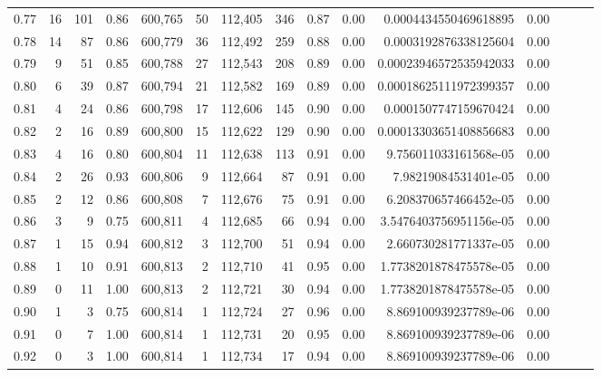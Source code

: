 \begin{tabular}{rrrrrrrrrrrrrrr}
0.77 &      16 &    101 &  0.86 &  600,765 &       50 &  112,405 &      346 &  0.87 &  0.00 &   0.0004434550469618895 &      0.00 \\
0.78 &      14 &     87 &  0.86 &  600,779 &       36 &  112,492 &      259 &  0.88 &  0.00 &   0.0003192876338125604 &      0.00 \\
0.79 &       9 &     51 &  0.85 &  600,788 &       27 &  112,543 &      208 &  0.89 &  0.00 &  0.00023946572535942033 &      0.00 \\
0.80 &       6 &     39 &  0.87 &  600,794 &       21 &  112,582 &      169 &  0.89 &  0.00 &  0.00018625111972399357 &      0.00 \\
0.81 &       4 &     24 &  0.86 &  600,798 &       17 &  112,606 &      145 &  0.90 &  0.00 &   0.0001507747159670424 &      0.00 \\
0.82 &       2 &     16 &  0.89 &  600,800 &       15 &  112,622 &      129 &  0.90 &  0.00 &  0.00013303651408856683 &      0.00 \\
0.83 &       4 &     16 &  0.80 &  600,804 &       11 &  112,638 &      113 &  0.91 &  0.00 &   9.756011033161568e-05 &      0.00 \\
0.84 &       2 &     26 &  0.93 &  600,806 &        9 &  112,664 &       87 &  0.91 &  0.00 &    7.98219084531401e-05 &      0.00 \\
0.85 &       2 &     12 &  0.86 &  600,808 &        7 &  112,676 &       75 &  0.91 &  0.00 &   6.208370657466452e-05 &      0.00 \\
0.86 &       3 &      9 &  0.75 &  600,811 &        4 &  112,685 &       66 &  0.94 &  0.00 &  3.5476403756951156e-05 &      0.00 \\
0.87 &       1 &     15 &  0.94 &  600,812 &        3 &  112,700 &       51 &  0.94 &  0.00 &   2.660730281771337e-05 &      0.00 \\
0.88 &       1 &     10 &  0.91 &  600,813 &        2 &  112,710 &       41 &  0.95 &  0.00 &  1.7738201878475578e-05 &      0.00 \\
0.89 &       0 &     11 &  1.00 &  600,813 &        2 &  112,721 &       30 &  0.94 &  0.00 &  1.7738201878475578e-05 &      0.00 \\
0.90 &       1 &      3 &  0.75 &  600,814 &        1 &  112,724 &       27 &  0.96 &  0.00 &   8.869100939237789e-06 &      0.00 \\
0.91 &       0 &      7 &  1.00 &  600,814 &        1 &  112,731 &       20 &  0.95 &  0.00 &   8.869100939237789e-06 &      0.00 \\
0.92 &       0 &      3 &  1.00 &  600,814 &        1 &  112,734 &       17 &  0.94 &  0.00 &   8.869100939237789e-06 &      0.00 \\

\end{tabular}
